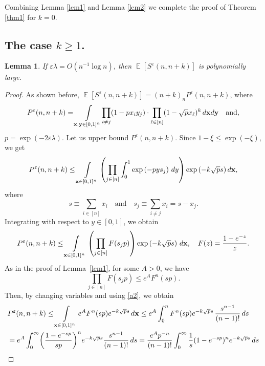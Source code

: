 \documentclass[11pt]{amsart}
\newtheorem{lemma}[theorem]{Lemma}
\newcommand{\E}{\operatorname{\mathbb{E}}}
\def\eps{\varepsilon}
\theoremstyle{remark}
\numberwithin{equation}{section}
\begin{document}
Combining Lemma \ref{lem1} and Lemma \ref{lem2} we complete the proof of Theorem \ref{thm1} for $k=0$.
\subsection{The case $k\ge 1$.}
\begin{lemma}\label{lem3}  If $\eps \lambda =O(n^{-1}\log n)$, then $\E[S^{\eps}(n,n+k)]$ is polynomially large. %
\end{lemma}
\begin{proof} As shown before,  $\E[S^{\eps}(n,n+k)]=(n+k)_n P^{\eps}(n,n+k)$, where
\begin{equation*}
P^{\eps}(n,n+k)=\int\limits_{\bold x,\bold y\in [0,1]^n}\!\prod_{i\neq j}(1-px_iy_j)\cdot\prod_{\ell\in [n]}(1-\sqrt{p}x_{\ell})^k\,d\bold x d\bold y \quad \text{and},%
\end{equation*}
$p =\exp(-2\eps\lambda)$. Let us  upper bound $P^{\eps}(n,n+k)$. 
Since $1-\xi \leq \exp(-\xi)$, we get
\begin{equation}\label{10}
P^{\eps}(n,n+k)\leq \int\limits_{\bold x\in [0,1]^n}\left(\prod_{j\in [n]}\int_0^1\exp\left(-pys_j\right)\,dy\right)\exp\left(-k\sqrt{p}s%
\right)
d\bold x,
\end{equation}
where
\begin{equation*}
    s \equiv \sum_{i \in [n]}x_i \quad \text{and} \quad s_j \equiv \sum_{i\neq j}x_i=s-x_j.
\end{equation*}
Integrating with respect to $y\in [0,1]$, we obtain 
\begin{equation}\label{a2}
 P^{\eps}(n,n+k) \leq \int\limits_{\bold x \in [0,1]^n}\left(\prod_{j\in [n]}F(s_j p)\right)\exp\left(-k\sqrt{p}s\right)\,d\bold x, \quad F(z) =\frac{1-e^{-z}}{z}.   
\end{equation}
As in the proof of Lemma~\ref{lem1}, for some $A>0$, we have
\begin{equation*}
\prod_{j\in [n]}F(s_jp)\le e^A F^n(sp).    
\end{equation*}
Then, by changing variables and using \eqref{a2}, we obtain
\begin{align*}
&P^{\eps}(n,n+k) \leq \int\limits_{\bold x \in [0,1]^n} e^A F^n(sp)e^{-k\sqrt{p}s}\,d\bold x \leq e^{A}\int_0^{n}F^n(sp)e^{-k\sqrt{p}s}\,\frac{s^{n-1}}{(n-1)!}\,ds\\
&= e^{A}\int_0^{\infty}\biggl(\frac{1-e^{-sp}}{sp}\biggr)^ne^{-k\sqrt{p}s}\frac{s^{n-1}}{(n-1)!}\,ds=\frac{e^Ap^{-n}}{(n-1)!}\int_0^{\infty} \frac{1}{s}(1-e^{-sp})^ne^{-k\sqrt{p}s}\,d s\\

\end{align*}
\end{proof}
\end{document}
